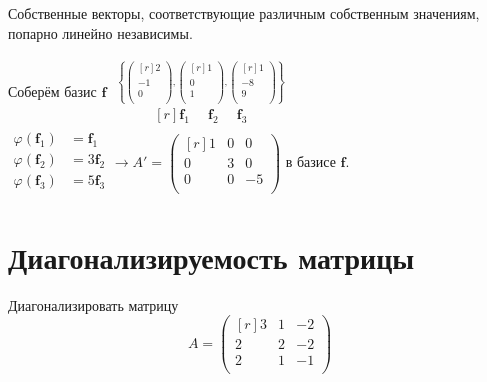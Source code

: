 \begin{lemma} %
	Собственные векторы, соответствующие различным собственным значениям, попарно линейно независимы.
\end{lemma}


Соберём базис $\textbf{f}$ %
$  %
\begin{matrix}
\overset{\left\{
	\begin{pmatrix*}[r]
	2\\ -1\\ 0\\ 
	\end{pmatrix*},
	\begin{pmatrix*}[r]
	1\\ 0\\ 1\\ 
	\end{pmatrix*},
	\begin{pmatrix*}[r]
	1\\ -8\\ 9\\ 
	\end{pmatrix*}
	\right\}}{
	\begin{matrix*}[r]
	\textbf{f$_1$}\phantom{3}&\textbf{f$_2$}&\phantom{2}\textbf{f$_3$}
	\end{matrix*}}
\end{matrix}
$\\
$
\left.
\begin{aligned} %
\varphi (\textbf{f$_1$})&=\textbf{f$_1$}\\ %
\varphi (\textbf{f$_2$})&=3\textbf{f$_2$} \\
\varphi (\textbf{f$_3$})&=5\textbf{f$_3$}\\
\end{aligned}
\right.
\to A'=
\begin{pmatrix*}[r]
1 & 0 & 0\\
0 & 3 & 0\\
0 & 0 & -5\\
\end{pmatrix*}
$
в базисе $\textbf{f}$.\\ %

\section{Диагонализируемость матрицы}
\begin{prim}
	Диагонализировать матрицу\\
	$$
	A=
	\begin{pmatrix*}[r]
	3 & 1 & -2\\
	2 & 2 & -2\\
	2 & 1 & -1\\
	\end{pmatrix*}
	$$
\end{prim}\\

